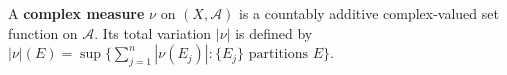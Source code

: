 A \textbf{complex measure} $\nu$ on $(X, \mathcal{A})$ is a countably additive complex-valued set function on $\mathcal{A}$. Its total variation $|\nu|$ is defined by $|\nu|(E) = \sup \{\sum_{j=1}^{n} |\nu(E_j)| : \{E_j\} \text{ partitions } E\}$.

